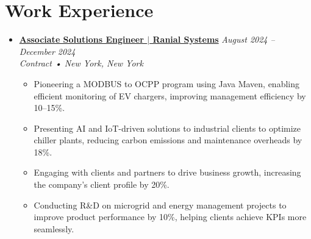 \documentclass[letterpaper,11pt]{article}
\begin{document}
\section{Work Experience}
\begin{itemize}[leftmargin=0mm, label={}, itemsep=1pt]  %

  \item \textbf{\href{https://www.ranial.com}{Associate Solutions Engineer $|$ Ranial Systems}} \hfill \textit{\small August 2024 -- December 2024} \\
  \small \textit{Contract • New York, New York} \vspace{-0.1\baselineskip}  %
  \begin{itemize}[leftmargin=5mm, itemsep=0pt, topsep=0pt]  %
    \item \small Pioneering a MODBUS to OCPP program using Java Maven, enabling efficient monitoring of EV chargers, improving management efficiency by 10--15\%.
    \item \small Presenting AI and IoT-driven solutions to industrial clients to optimize chiller plants, reducing carbon emissions and maintenance overheads by 18\%.
    \item \small Engaging with clients and partners to drive business growth, increasing the company’s client profile by 20\%.
    \item \small Conducting R\&D on microgrid and energy management projects to improve product performance by 10\%, helping clients achieve KPIs more seamlessly.
  \end{itemize}
\end{itemize}
\end{document}
